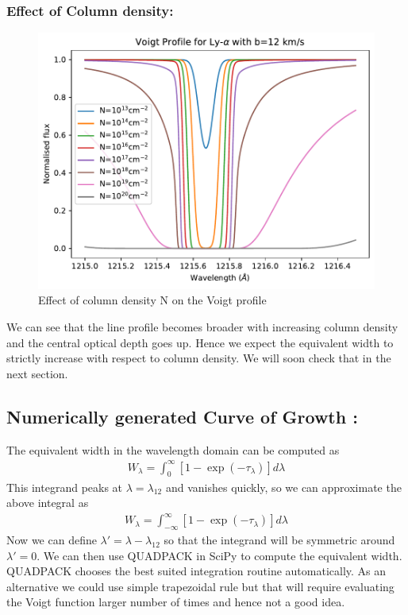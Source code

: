\documentclass[12pt]{article}
\begin{document}
\subsubsection{Effect of Column density:}

\begin{figure}[H]
\centering
\includegraphics[width=1\linewidth]{../Voigt-Ly-a_vary_N}
\caption{Effect of column density N on the Voigt profile}
\label{fig:voigt-ly-a_vary_N}
\end{figure}

We can see that the line profile becomes broader with increasing column density and the central optical depth goes up. Hence we expect the equivalent width to strictly increase with respect to column density. We will soon check that in the next section.



\subsection{Numerically generated Curve of Growth :}

The equivalent width in the wavelength domain can be computed as
\begin{align}
W_{\lambda} = \int_{0}^{\infty} [1 -\exp (-\tau_{\lambda})] d\lambda
\end{align}
This integrand peaks at $\lambda=\lambda_{12}$ and vanishes quickly, so we can approximate the above integral as
\begin{align}
W_{\lambda} = \int_{-\infty}^{\infty} [1 -\exp (-\tau_{\lambda})] d\lambda
\end{align}
Now we can define $\lambda' = \lambda - \lambda_{12}$ so that the integrand will be symmetric around $\lambda' = 0$. We can then use QUADPACK in SciPy to compute the equivalent width. QUADPACK chooses the best suited integration routine automatically. As an alternative we could use simple trapezoidal rule but that will require evaluating the Voigt function larger number of times and hence not a good idea.
\end{document}
